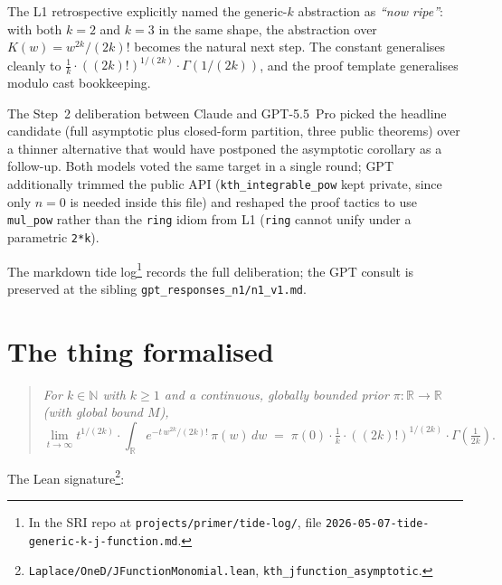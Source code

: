 \documentclass[11pt]{article}
\begin{document}
\noindent The L1 retrospective explicitly named the generic-$k$
abstraction as \emph{``now ripe''}: with both $k=2$ and $k=3$ in the
same shape, the abstraction over $K(w) = w^{2k}/(2k)!$ becomes the
natural next step. The constant generalises cleanly to
$\tfrac{1}{k}\cdot ((2k)!)^{1/(2k)}\cdot \Gamma(1/(2k))$, and the
proof template generalises modulo cast bookkeeping.

The Step~2 deliberation between Claude and GPT-5.5~Pro picked the
headline candidate (full asymptotic plus closed-form partition, three
public theorems) over a thinner alternative that would have postponed
the asymptotic corollary as a follow-up. Both models voted the same
target in a single round; GPT additionally trimmed the public API
(\texttt{kth\_integrable\_pow} kept private, since only $n=0$ is
needed inside this file) and reshaped the proof tactics to use
\texttt{mul\_pow} rather than the \texttt{ring} idiom from L1
(\texttt{ring} cannot unify under a parametric \texttt{2*k}).

The markdown tide log\footnote{In the SRI repo at
\texttt{projects/primer/tide-log/}, file
\texttt{2026-05-07-tide-generic-k-j-function.md}.}
records the full deliberation; the GPT consult is preserved at the
sibling \texttt{gpt\_responses\_n1/n1\_v1.md}.

\section{The thing formalised}

\begin{quote}\itshape
For $k \in \mathbb N$ with $k \ge 1$ and a continuous, globally
bounded prior $\pi : \mathbb R \to \mathbb R$ (with global bound $M$),
$$
  \lim_{t \to \infty} t^{1/(2k)} \cdot
    \int_{\mathbb R} e^{-t\,w^{2k}/(2k)!}\,\pi(w)\,dw
  \;=\; \pi(0) \cdot \tfrac{1}{k} \cdot ((2k)!)^{1/(2k)}
        \cdot \Gamma\!\left(\tfrac{1}{2k}\right).
$$
\end{quote}

\noindent The Lean signature\footnote{\texttt{Laplace/OneD/JFunctionMonomial.lean},
\texttt{kth\_jfunction\_asymptotic}.}:
\end{document}

